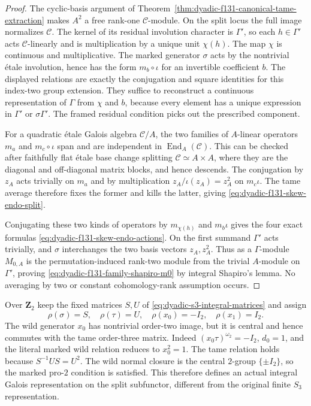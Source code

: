 \begin{proof}
The cyclic-basis
argument of
Theorem~\ref{thm:dyadic-f131-canonical-tame-extraction}
makes $A^2$ a free
rank-one $\mathcal C$-module.
On the split locus
the full image
normalizes $\mathcal C$.
The kernel of its
residual involution
character is
$\Gamma'$, so
each $h\in\Gamma'$
acts $\mathcal C$-linearly
and is multiplication
by a unique unit
$\chi(h)$.  The map
$\chi$ is continuous
and multiplicative.
The marked generator
$\sigma$ acts by the
nontrivial étale
involution, hence
has the form
$m_b\circ\iota$
for an invertible
coefficient $b$.
The displayed
relations are exactly
the conjugation
and square identities
for this index-two
group extension.
They suffice to
reconstruct a continuous
representation of
$\Gamma$ from
$\chi$ and $b$,
because every element
has a unique
expression in
$\Gamma'$ or
$\sigma\Gamma'$.
The framed residual
condition picks out
the prescribed
component.

For a quadratic
étale Galois
algebra $\mathcal C/A$,
the two families
of $A$-linear
operators $m_a$
and $m_c\circ\iota$
span and are
independent in
$\operatorname{End}_A(\mathcal C)$.
This can be checked
after faithfully
flat étale base
change splitting
$\mathcal C\simeq A\times A$,
where they are
the diagonal and
off-diagonal
matrix blocks,
and hence descends.
The conjugation
by $z_A$ acts
trivially on
$m_a$ and by
multiplication
$z_A/\iota(z_A)=z_A^2$
on $m_c\iota$.
The tame average
therefore fixes
the former and
kills the latter,
giving
\eqref{eq:dyadic-f131-skew-endo-split}.

Conjugating these
two kinds of
operators by
$m_{\chi(h)}$
and $m_b\iota$
gives the four
exact formulas
\eqref{eq:dyadic-f131-skew-endo-actions}.
On the first
summand $\Gamma'$
acts trivially,
and $\sigma$
interchanges the
two basis vectors
$z_A,z_A^2$.
Thus as a
$\Gamma$-module
$M_{0,A}$ is the
permutation-induced
rank-two module
from the trivial
$A$-module on
$\Gamma'$, proving
\eqref{eq:dyadic-f131-family-shapiro-m0}
by integral
Shapiro's lemma.
No averaging by
two or constant
cohomology-rank
assumption occurs.
\end{proof}

\begin{example}
\label{ex:dyadic-f131-nontrivial-split-wild-point}
Over $\mathbf Z_2$ keep
the fixed matrices
$S,U$ of
\eqref{eq:dyadic-s3-integral-matrices}
and assign
\[
\rho(\sigma)=S,\quad
\rho(\tau)=U,\quad
\rho(x_0)=-I_2,\quad
\rho(x_1)=I_2.
\]
The wild generator
$x_0$ has nontrivial
order-two image,
but it is central
and hence commutes
with the tame
order-three matrix.
Indeed
$(x_0\tau)^{\omega_2}=-I_2$,
$d_0=1$, and the
literal marked
wild relation
reduces to
$x_0^2=1$.
The tame relation
holds because
$S^{-1}US=U^2$.
The wild normal
closure is the
central $2$-group
$\{\pm I_2\}$,
so the marked
pro-$2$ condition
is satisfied.
This therefore
defines an
actual integral
Galois representation
on the split
subfunctor, different
from the original
finite $S_3$
representation.
\end{example}

